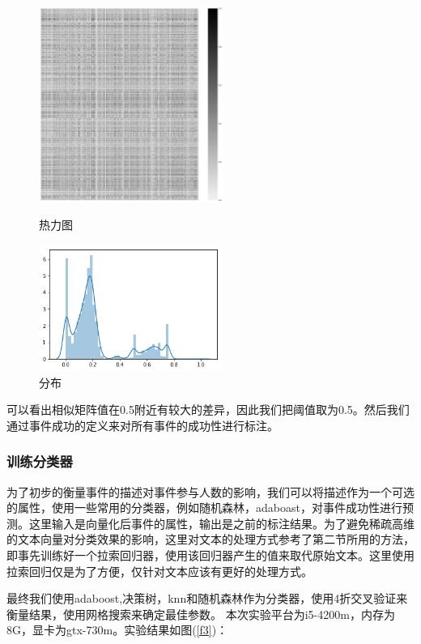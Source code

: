 \begin{figure}[htbp]
  \centering
  \begin{minipage}[t]{0.48\textwidth}
  \centering
  \includegraphics[width=6cm]{event_sim.png}
  \caption{热力图}
  \label{ff1}
  \end{minipage}
  \begin{minipage}[t]{0.48\textwidth}
  \centering
  \includegraphics[width=6cm]{event_sim_dist.png}
  \caption{分布}
  \label{ff2}
  \end{minipage}
\end{figure}

可以看出相似矩阵值在0.5附近有较大的差异，因此我们把阈值取为0.5。然后我们通过事件成功的定义来对所有事件的成功性进行标注。

\subsubsection{训练分类器}
为了初步的衡量事件的描述对事件参与人数的影响，我们可以将描述作为一个可选的属性，使用一些常用的分类器，例如随机森林，adaboast，对事件成功性进行预测。这里输入是向量化后事件的属性，输出是之前的标注结果。为了避免稀疏高维的文本向量对分类效果的影响，这里对文本的处理方式参考了第二节所用的方法，即事先训练好一个拉索回归器，使用该回归器产生的值来取代原始文本。这里使用拉索回归仅是为了方便，仅针对文本应该有更好的处理方式。

最终我们使用adaboost,决策树，knn和随机森林作为分类器，使用4折交叉验证来衡量结果，使用网格搜索来确定最佳参数。
本次实验平台为i5-4200m，内存为8G，显卡为gtx-730m。实验结果如图(\ref{f3})：

